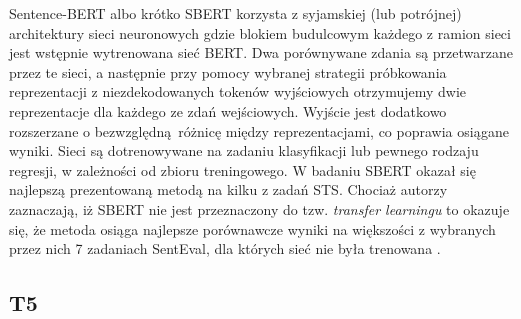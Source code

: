 Sentence-BERT albo krótko SBERT korzysta z syjamskiej (lub potrójnej) architektury sieci neuronowych gdzie blokiem budulcowym każdego z ramion sieci jest wstępnie wytrenowana sieć BERT. Dwa porównywane zdania są przetwarzane przez te sieci, a następnie przy pomocy wybranej strategii próbkowania reprezentacji z niezdekodowanych tokenów wyjściowych otrzymujemy dwie reprezentacje dla każdego ze zdań wejściowych. Wyjście jest dodatkowo rozszerzane o bezwzględną różnicę między reprezentacjami, co poprawia osiągane wyniki. Sieci są dotrenowywane na zadaniu klasyfikacji lub pewnego rodzaju regresji, w zależności od zbioru treningowego. W badaniu SBERT okazał się najlepszą prezentowaną metodą na kilku z zadań STS. Chociaż autorzy zaznaczają, iż SBERT nie jest przeznaczony do tzw. \emph{transfer learningu} to okazuje się, że metoda osiąga najlepsze porównawcze wyniki na większości z wybranych przez nich 7 zadaniach SentEval, dla których sieć nie była trenowana \autocite{reimers2019sentence}.

\subsection{T5}

